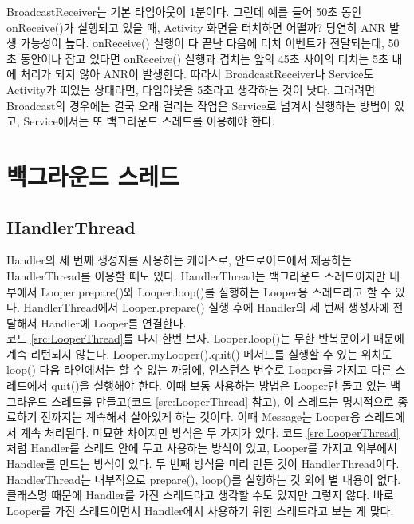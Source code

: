 BroadcastReceiver는 기본 타임아웃이 1분이다. 그런데 예를 들어 50초 동안 onReceive()가 실행되고 있을 때, Activity 화면을 터치하면 어떨까? 당연히 ANR 발생 가능성이 높다. onReceive() 실행이 다 끝난 다음에 터치 이벤트가 전달되는데, 50초 동안이나 잡고 있다면 onReceive() 실행과 겹치는 앞의 45초 사이의 터치는 5초 내에 처리가 되지 않아 ANR이 발생한다.
따라서 BroadcastReceiver나 Service도 Activity가 떠있는 상태라면, 타임아웃을 5초라고 생각하는 것이 낫다.
그러려면 Broadcast의 경우에는 결국 오래 걸리는 작업은 Service로 넘겨서 실행하는 방법이 있고, Service에서는 또 백그라운드 스레드를 이용해야 한다.\\


\chapter{백그라운드 스레드}

\section{HandlerThread}
Handler의 세 번째 생성자를 사용하는 케이스로, 안드로이드에서 제공하는 HandlerThread를 이용할 때도 있다.
HandlerThread는 백그라운드 스레드이지만 내부에서 Looper.prepare()와 Looper.loop()를 실행하는 Looper용 스레드라고 할 수 있다.
HandlerThread에서 Looper.prepare() 실행 후에 Handler의 세 번째 생성자에 전달해서 Handler에 Looper를 연결한다.\\

코드 \ref{src:LooperThread}를 다시 한번 보자. Looper.loop()는 무한 반복문이기 때문에 계속 리턴되지 않는다.
Looper.myLoop\-er().quit() 메서드를 실행할 수 있는 위치도 loop() 다음 라인에서는 할 수 없는 까닭에, 인스턴스 변수로 Looper를 가지고 다른 스레드에서 quit()을 실행해야 한다.
이때 보통 사용하는 방법은 Looper만 돌고 있는 백그라운드 스레드를 만들고(코드 \ref{src:LooperThread} 참고), 이 스레드는 명시적으로 종료하기 전까지는 계속해서 살아있게 하는 것이다. 이때 Message는 Looper용 스레드에서 계속 처리된다.
미묘한 차이지만 방식은 두 가지가 있다. 코드 \ref{src:LooperThread}처럼 Handler를 스레드 안에 두고 사용하는 방식이 있고, Looper를 가지고 외부에서 Handler를 만드는 방식이 있다. 
두 번째 방식을 미리 만든 것이 HandlerThread이다.
HandlerThread는 내부적으로 prepare(), loop()를 실행하는 것 외에 별 내용이 없다. 클래스명 때문에 Handler를 가진 스레드라고 생각할 수도 있지만 그렇지 않다. 바로 Looper를 가진 스레드이면서 Handler에서 사용하기 위한 스레드라고 보는 게 맞다.\\

